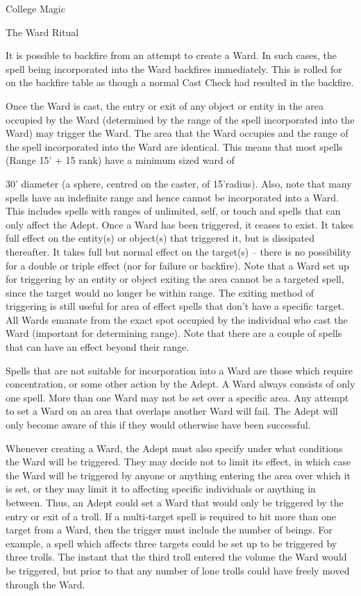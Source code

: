 \begin{Chapter}{College Magic}
\begin{ritual}{The Ward Ritual}
\begin{effects}
It is possible to backfire from an attempt to create a Ward.  In such
cases, the spell being incorporated into the Ward backfires
immediately. This is rolled for on the backfire table as though a
normal Cast Check had resulted in the backfire.

Once the Ward is cast, the entry or exit of any object or entity in
the area occupied by the Ward (determined by the range of the spell
incorporated into the Ward) may trigger the Ward. The area that the
Ward occupies and the range of the spell incorporated into the Ward
are identical.  This means that most spells (Range 15’ + 15 rank) have
a minimum sized ward of

30’ diameter (a sphere, centred on the caster, of 15’radius).  Also,
note that many spells have an indefinite range and hence cannot be
incorporated into a Ward.  This includes spells with ranges of
unlimited, self, or touch and spells that can only affect the
Adept. Once a Ward has been triggered, it ceases to exist. It takes
full effect on the entity(s) or object(s) that triggered it, but is
dissipated thereafter.  It takes full but normal effect on the
target(s) – there is no possibility for a double or triple effect (nor
for failure or backfire).  Note that a Ward set up for triggering by
an entity or object exiting the area cannot be a targeted spell, since
the target would no longer be within range.  The exiting method of
triggering is still useful for area of effect spells that don’t have a
specific target.  All Wards emanate from the exact spot occupied by
the individual who cast the Ward (important for determining range).
Note that there are a couple of spells that can have an effect beyond
their range.

Spells that are not suitable for incorporation into a Ward are those
which require concentration, or some other action by the Adept.  A
Ward always consists of only one spell.  More than one Ward may not be
set over a specific area. Any attempt to set a Ward on an area that
overlaps another Ward will fail. The Adept will only become aware of
this if they would otherwise have been successful.

Whenever creating a Ward, the Adept must also specify under what
conditions the Ward will be triggered.  They may decide not to limit
its effect, in which case the Ward will be triggered by anyone or
anything entering the area over which it is set, or they may limit it
to affecting specific individuals or anything in between.  Thus, an
Adept could set a Ward that would only be triggered by the entry or
exit of a troll.  If a multi-target spell is required to hit more than
one target from a Ward, then the trigger must include the number of
beings.  For example, a spell which affects three targets could be set
up to be triggered by three trolls. The instant that the third troll
entered the volume the Ward would be triggered, but prior to that any
number of lone trolls could have freely moved through the Ward.


\end{effects}
\end{ritual}
\end{Chapter}
